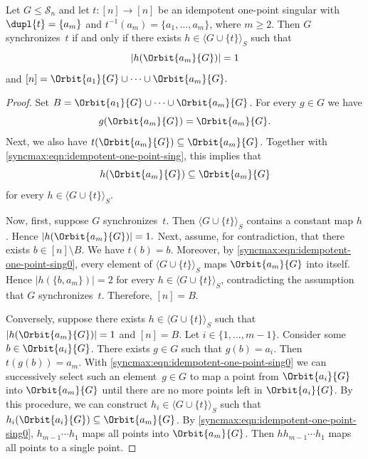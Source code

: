 \begin{lemma}
	Let $G \le \mathcal S_n$ and let
	$t \colon [n] \to [n]$ be an idempotent one-point singular
	with $\dupl{t}=\{a_m\}$ and
	$t^{-1}(a_m)=\{a_1,\ldots,a_m\}$, where $m\ge2$.
Then $G$ synchronizes~$t$ if and only if
 there exists
$h\in\langle G\cup\{t\}\rangle_S$
such that
\[
|h(\Orbit{a_m}{G})|=1
\]
and
$
[n]
= \Orbit{a_1}{G}\cup\cdots\cup\Orbit{a_m}{G}.
$
\end{lemma}
\begin{proof}
		Set $B = \Orbit{a_1}{G} \cup \cdots \cup \Orbit{a_m}{G}$. For every $g \in G$ we have
		\begin{equation} \label{syncmax:eqn:idempotent-one-point-sing}
			g(\Orbit{a_m}{G}) = \Orbit{a_m}{G}.
		\end{equation}
		Next, we also have $t(\Orbit{a_m}{G}) \subseteq \Orbit{a_m}{G}$.
		Together with \cref{syncmax:eqn:idempotent-one-point-sing}, this implies that
		\begin{equation}\label{syncmax:eqn:idempotent-one-point-sing0}
			h(\Orbit{a_m}{G})\subseteq\Orbit{a_m}{G}
		\end{equation}
		for every $h\in\langle G\cup\{t\}\rangle_S$.
						
		Now, first, suppose $G$ synchronizes~$t$. 
		Then $\langle G\cup\{t\}\rangle_S$ contains a constant map
		$h$. Hence
		$
		|h(\Orbit{a_m}{G})|=1.
		$
		Next, assume, for contradiction, that there exists
		$b\in[n]\setminus B$.
		We have $t(b) = b$. Moreover, by \cref{syncmax:eqn:idempotent-one-point-sing0},
		every element of $\langle G\cup\{t\}\rangle_S$
		maps $\Orbit{a_m}{G}$ into itself.
		Hence
		$
		|h(\{b,a_m\})|=2
		$
		for every
		$h\in\langle G\cup\{t\}\rangle_S$,
		contradicting the assumption that
		$G$ synchronizes~$t$.
		Therefore,
		$
		[n]=B.
		$
		
		Conversely, suppose there exists $h \in \langle G \cup \{t\} \rangle_S$ such that
		$|h(\Orbit{a_m}{G})| = 1$ and $[n] = B$. Let $i \in \{1,\ldots,m-1\}$.		
		Consider some $b \in \Orbit{a_i}{G}$.
		There exists $g \in G$ such that $g(b) = a_i$.
		Then $t(g(b)) = a_m$.
		With \cref{syncmax:eqn:idempotent-one-point-sing0}
		we can successively select such an element~$g \in G$
		to map a point from $\Orbit{a_i}{G}$
		into $\Orbit{a_m}{G}$ until there are no more points
		left in $\Orbit{a_i}{G}$.
		By this procedure, we can construct $h_i \in \langle G \cup \{t\} \rangle_S$
		such that $h_i(\Orbit{a_i}{G}) \subseteq \Orbit{a_m}{G}$.
		By \cref{syncmax:eqn:idempotent-one-point-sing0},
		$h_{m-1} \cdots h_1$ maps all points into $\Orbit{a_m}{G}$.
		Then $h h_{m-1} \cdots h_1$ maps all points to a single point.
\end{proof}
